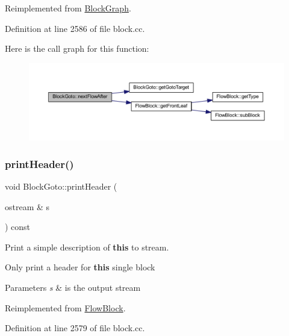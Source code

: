 Reimplemented from \mbox{\hyperlink{class_block_graph_aba0d42cf572bdcf2bca44d22fad971f6}{Block\+Graph}}.



Definition at line 2586 of file block.\+cc.

Here is the call graph for this function\+:
\nopagebreak
\begin{figure}[H]
\begin{center}
\leavevmode
\includegraphics[width=350pt]{class_block_goto_acc1628a26572e23d61f4b4dad717816e_cgraph}
\end{center}
\end{figure}
\mbox{\label{class_block_goto_a01f0af5a9043ec72c96e3f2591d0c469}} 
\subsubsection{\texorpdfstring{printHeader()}{printHeader()}}
{\footnotesize\ttfamily void Block\+Goto\+::print\+Header (\begin{DoxyParamCaption}\item[{ostream \&}]{s }\end{DoxyParamCaption}) const\hspace{0.3cm}{\ttfamily [virtual]}}



Print a simple description of {\bfseries{this}} to stream. 

Only print a header for {\bfseries{this}} single block 
\begin{DoxyParams}{Parameters}
{\em s} & is the output stream \\
\hline
\end{DoxyParams}


Reimplemented from \mbox{\hyperlink{class_flow_block_a0d19c5b80186cf289dfbe0ce9e3ce37a}{Flow\+Block}}.



Definition at line 2579 of file block.\+cc.

